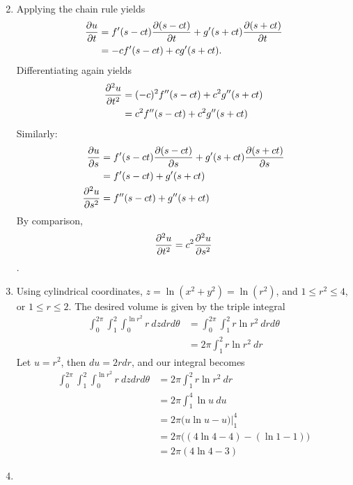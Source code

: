 \documentclass{article}
\begin{document}
\begin{enumerate}
\begin{align*}
\end{align*}
\item %
Applying the chain rule yields
\begin{align*}
  \frac{\partial u}{\partial t} &= f'(s-ct)\frac{\partial (s-ct)}{\partial t} + g'(s+ct)\frac{\partial (s+ct)}{\partial t} \\ &= -c f'(s-ct) + cg'(s+ct).
\end{align*}
Differentiating again yields
\begin{align*}
  \frac{\partial^2u}{\partial t^2} &= ( -c)^2 f''(s-ct) + c^2g''(s+ct) \\& =  c^2 f''(s-ct) + c^2g''(s+ct)
\end{align*}
Similarly:
\begin{align*}
  \frac{\partial u}{\partial s} &= f'(s-ct)\frac{\partial (s-ct)}{\partial s} + g'(s+ct)\frac{\partial (s+ct)}{\partial s} \\& = f'(s-ct) + g'(s+ct) \\
  \frac{\partial^2 u}{\partial s^2} &= f''(s-ct) + g''(s+ct) 
\end{align*}
By comparison, \begin{align*}\frac{\partial^2u}{\partial t^2} = c^2\frac{\partial^2 u}{\partial s^2} \end{align*}.
\item %
Using cylindrical coordinates, $ z =\ln(x^2+y^2) = \ln(r^2)$, and $1 \le r^2 \le 4$, or $1\le r \le 2$. The desired volume is given by the triple integral
\begin{align*}
  {\int_0^{2\pi} \!\! \int_{1}^{2} \!\! \int_{0}^{\ln r^2}} r\ dz dr d\theta 
  &= {\int_0^{2\pi} \!\! \int_{1}^{2}} r\ln r^2 \  dr d\theta \\
  &=2\pi \int_{1}^{2} r\ln r^2 \  dr 
\end{align*}
Let $u=r^2$, then $du = 2rdr$, and our integral becomes
\begin{align*}
  {\int_0^{2\pi} \!\! \int_{1}^{2} \!\! \int_{0}^{\ln r^2}} r\ dz dr d\theta 
  &=2\pi \int_{1}^{2} r\ln r^2 \  dr \\
  &=2\pi \int_{1}^{4} \ln u \  du  \\
  &=2\pi\Big( u \ln u -u \Big)\Big|_{1}^{4}  \\
  &=2\pi\Big( (4 \ln 4 -4)-(\ln 1 -1)  \Big)  \\
  &=2\pi (4 \ln 4 - 3)
\end{align*}
\item %

\end{enumerate}
\end{document}
